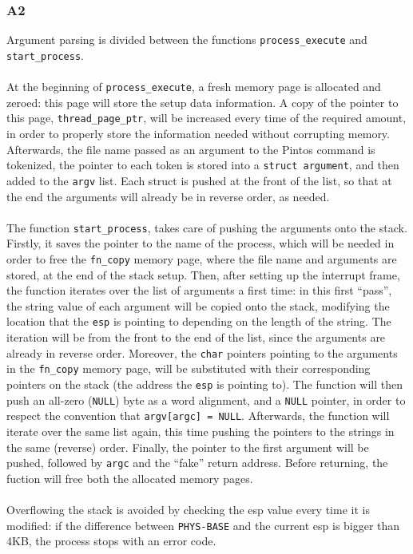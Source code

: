 \documentclass[a4wide, 11pt]{article}
\newcommand{\tx}{\texttt}
\begin{document}
\subsubsection{A2}
Argument parsing is divided between the functions \tx{process\_execute} and \tx{start\_process}. \\\\
At the beginning of \tx{process\_execute}, a fresh memory page is allocated and zeroed: this page will store the setup data information. A copy of the pointer to this page, \tx{thread\_page\_ptr}, will be increased every time of the required amount, in order to properly store the information needed without corrupting memory. Afterwards, the file name passed as an argument to the Pintos command is tokenized, the pointer to each token is stored into a \tx{struct argument}, and then added to the \tx{argv} list. Each struct is pushed at the front of the list, so that at the end the arguments will already be in reverse order, as needed. \\\\
The function \tx{start\_process}, takes care of pushing the arguments onto the stack. Firstly, it saves the pointer to the name of the process, which will be needed in order to free the \tx{fn\_copy} memory page, where the file name and arguments are stored, at the end of the stack setup. Then, after setting up the interrupt frame, the function iterates over the list of arguments a first time: in this first ``pass'', the string value of each argument will be copied onto the stack, modifying the location that the \tx{esp} is pointing to depending on the length of the string. The iteration will be from the front to the end of the list, since the arguments are already in reverse order. Moreover, the \tx{char} pointers pointing to the arguments in the \tx{fn\_copy} memory page, will be substituted with their corresponding pointers on the stack (the address the \tx{esp} is pointing to). The function will then push an all-zero (\tx{NULL}) byte as a word alignment, and a \tx{NULL} pointer, in order to respect the convention that \tx{argv[argc] = NULL}. Afterwards, the function will iterate over the same list again, this time pushing the pointers to the strings in the same (reverse) order. Finally, the pointer to the first argument will be pushed, followed by \tx{argc} and the ``fake'' return address. Before returning, the fuction will free both the allocated memory pages. \\\\
Overflowing the stack is avoided by checking the esp value every time it is modified: if the difference between \tx{PHYS-BASE} and the current esp is bigger than 4KB, the process stops with an error code.
\end{document}
